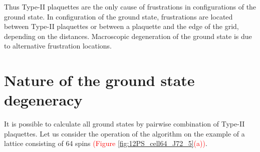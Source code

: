 \documentclass[preprint,12pt]{elsarticle}
\begin{document}
	Thus Type-II plaquettes are the only cause of frustrations in configurations of the ground state. In configuration of the ground state, frustrations are located between Type-II plaquettes or between a plaquette and the edge of the grid, depending on the distances. Macroscopic degeneration of the ground state is due to alternative frustration locations.
	
	\section{Nature of the ground state degeneracy}
	
	It is possible to calculate all ground states by pairwise combination of Type-II plaquettes. Let us consider the operation of the algorithm on the example of a lattice consisting of 64 spins \textcolor{red}{(Figure \ref{fig:12PS_cell64_J72_5}(a))}.
	
\end{document}

